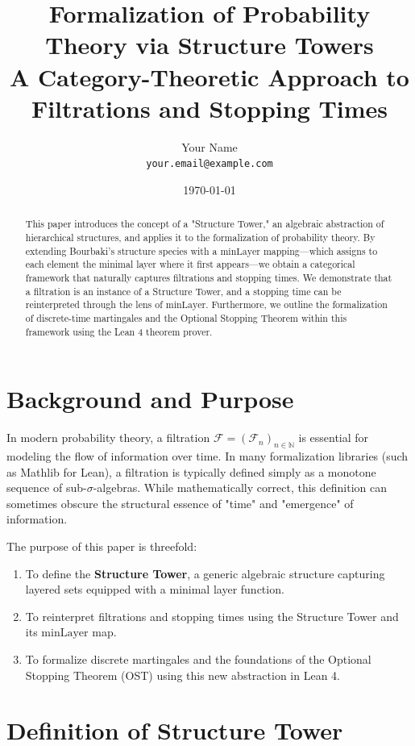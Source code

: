 \documentclass[11pt, a4paper]{article}
\title{Formalization of Probability Theory via Structure Towers \\
\large A Category-Theoretic Approach to Filtrations and Stopping Times}
\author{Your Name \\ \texttt{your.email@example.com}}
\date{\today}
\theoremstyle{definition}
\theoremstyle{plain}
\newcommand{\N}{\mathbb{N}}
\newcommand{\F}{\mathcal{F}}
\newcommand{\minLayer}{\mathrm{minLayer}}
\begin{document}
\maketitle

\begin{abstract}
This paper introduces the concept of a "Structure Tower," an algebraic abstraction of hierarchical structures, and applies it to the formalization of probability theory. By extending Bourbaki's structure species with a $\minLayer$ mapping---which assigns to each element the minimal layer where it first appears---we obtain a categorical framework that naturally captures filtrations and stopping times. We demonstrate that a filtration is an instance of a Structure Tower, and a stopping time can be reinterpreted through the lens of $\minLayer$. Furthermore, we outline the formalization of discrete-time martingales and the Optional Stopping Theorem within this framework using the Lean 4 theorem prover. 
\end{abstract}

\section{Background and Purpose}

In modern probability theory, a filtration $\F = (\F_n)_{n \in \N}$ is essential for modeling the flow of information over time. In many formalization libraries (such as Mathlib for Lean), a filtration is typically defined simply as a monotone sequence of sub-$\sigma$-algebras. While mathematically correct, this definition can sometimes obscure the structural essence of "time" and "emergence" of information.

The purpose of this paper is threefold:
\begin{enumerate}
    \item To define the \textbf{Structure Tower}, a generic algebraic structure capturing layered sets equipped with a minimal layer function.
    \item To reinterpret filtrations and stopping times using the Structure Tower and its $\minLayer$ map.
    \item To formalize discrete martingales and the foundations of the Optional Stopping Theorem (OST) using this new abstraction in Lean 4.
\end{enumerate}

\section{Definition of Structure Tower}
\end{document}
